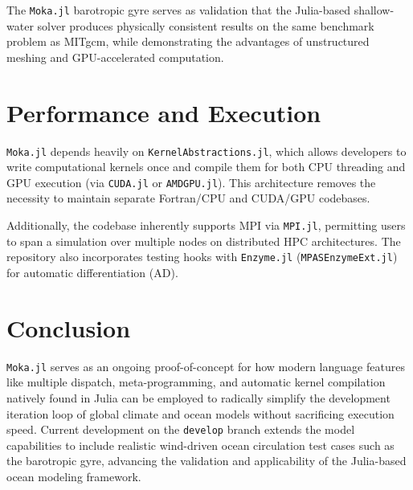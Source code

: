 \documentclass[12pt]{my-preprint}
\begin{document}
The \texttt{Moka.jl} barotropic gyre serves as validation that the Julia-based shallow-water solver produces physically consistent results on the same benchmark problem as MITgcm, while demonstrating the advantages of unstructured meshing and GPU-accelerated computation.

\section{Performance and Execution}
\texttt{Moka.jl} depends heavily on \texttt{KernelAbstractions.jl}, which allows developers to write computational kernels once and compile them for both CPU threading and GPU execution (via \texttt{CUDA.jl} or \texttt{AMDGPU.jl}). This architecture removes the necessity to maintain separate Fortran/CPU and CUDA/GPU codebases.

Additionally, the codebase inherently supports MPI via \texttt{MPI.jl}, permitting users to span a simulation over multiple nodes on distributed HPC architectures. The repository also incorporates testing hooks with \texttt{Enzyme.jl} (\texttt{MPASEnzymeExt.jl}) for automatic differentiation (AD).

\section{Conclusion}
\texttt{Moka.jl} serves as an ongoing proof-of-concept for how modern language features like multiple dispatch, meta-programming, and automatic kernel compilation natively found in Julia can be employed to radically simplify the development iteration loop of global climate and ocean models without sacrificing execution speed. Current development on the \texttt{develop} branch extends the model capabilities to include realistic wind-driven ocean circulation test cases such as the barotropic gyre, advancing the validation and applicability of the Julia-based ocean modeling framework.
\end{document}
